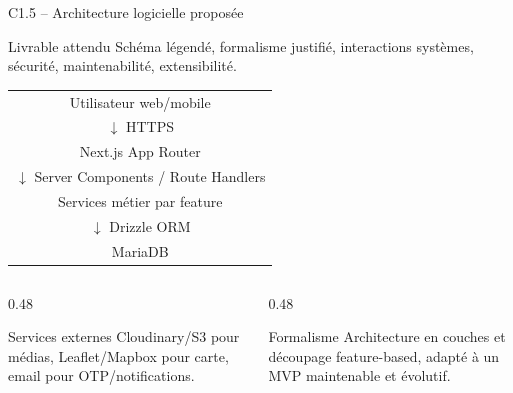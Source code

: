 \documentclass[aspectratio=169,11pt]{beamer}
\newcommand{\competence}[2]{%
  \begin{block}{#1}
    #2
  \end{block}
}
\begin{document}
\begin{frame}{C1.5 -- Architecture logicielle proposée}
  \competence{Livrable attendu}{Schéma légendé, formalisme justifié, interactions systèmes, sécurité, maintenabilité, extensibilité.}
  \small
  \begin{center}
    \begin{tabular}{c}
      Utilisateur web/mobile \\
      $\downarrow$ HTTPS \\
      Next.js App Router \\
      $\downarrow$ Server Components / Route Handlers \\
      Services métier par feature \\
      $\downarrow$ Drizzle ORM \\
      MariaDB \\
    \end{tabular}
  \end{center}
  \begin{columns}[T]
    \begin{column}{0.48\textwidth}
      \begin{block}{Services externes}
        Cloudinary/S3 pour médias, Leaflet/Mapbox pour carte, email pour OTP/notifications.
      \end{block}
    \end{column}
    \begin{column}{0.48\textwidth}
      \begin{block}{Formalisme}
        Architecture en couches et découpage feature-based, adapté à un MVP maintenable et évolutif.
      \end{block}
    \end{column}
  \end{columns}
\end{frame}
\end{document}
